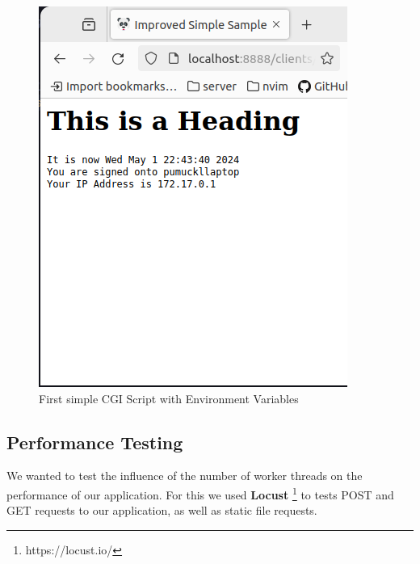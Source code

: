 \begin{figure}[h]
\begin{minipage}{0.35\textwidth}
        \includegraphics[width=\textwidth]{figures/cgi.png}
        \caption{First simple CGI Script with Environment Variables}
    \end{minipage}
\end{figure}
\vspace{-15pt}
\subsection*{Performance Testing}
We wanted to test the influence of the number of worker threads on the performance of our application. For this we used \textbf{Locust} \footnote{https://locust.io/} to tests POST and GET requests to our application, as well as static file requests. 
